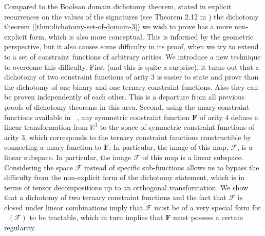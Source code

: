 \documentclass[11pt]{article}
\DeclareMathOperator{\hols}{Holant^*}
\DeclareMathOperator{\holts}{Holant^*_3}
\begin{document}
Compared to 
the Boolean domain dichotomy theorem, stated in explicit
  recurrences
on the values of the signatures (see Theorem 2.12 in \cite{cai_complexity_2017}) the dichotomy theorem (\cref{thm:dichotomy-set-of-domain-3})
we wish to prove has a more
non-explicit
form, which is also more conceptual. This is informed by the
geometric perspective, but it also causes some difficulty in its proof,
when we try to extend
to a set of constraint functions of arbitrary arities.
We introduce a new  technique   to overcome this difficulty.
 First (and this is quite a surprise), it turns out that a dichotomy of two constraint functions of arity $3$ is easier to state and prove than the dichotomy of one binary and one ternary constraint functions. Also they can be proven independently of each other.
This is a departure from all previous proofs of dichotomy theorems in this area.
Second, using the unary constraint functions available in $\hols$, any symmetric constraint function $\mathbf{F}$ of arity $4$  defines a linear transformation from $\mathbb{R}^3$ to the space of symmetric constraint functions of arity $3$, which corresponds to the ternary constraint functions constructible by connecting a unary function to $\mathbf{F}$.
In particular, the image of this map, $\mathscr{F}$, is a linear subspace. 
In particular, the image $\mathscr{F}$ of this map is a linear subspace.
Considering the space $\mathscr{F}$ instead of specific 
sub-functions allows us to bypass the difficulty from the non-explicit form of the  dichotomy
statement, which is  in terms of tensor decompositions up to 
an orthogonal transformation.
We show that a dichotomy of two ternary constraint functions and the fact that $\mathscr{F}$ is closed under linear combinations imply that $\mathscr{F}$ must be of a very special form for $\holts(\mathscr{F})$ to be tractable, which in turn implies that $\mathbf{F}$ must possess a certain regularity.
\end{document}
